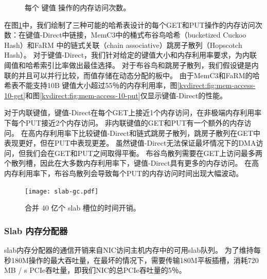 \begin{figure}[t]
\centering
{}

\vfill

\caption{每个 键值 操作的内存访问次数。}
\label{kvdirect:fig:mem-access-tput}

\end{figure}

在图\ref {kvdirect:fig:mem-access-tput}中，我们绘制了三种可能的哈希表设计的每个GET和PUT操作的内存访问次数：在键值-Direct中链接，MemC3中的桶式布谷鸟哈希（bucketized Cuckoo Hash）\cite {fan2013memc3}和FaRM \cite {dragojevic2014farm}中的链式关联（chain associative）跳房子散列（Hopscotch Hash）。
对于键值-Direct，我们针对给定的键值大小和内存利用率要求，为内联阈值和哈希索引比率做出最佳选择。
对于布谷鸟和跳房子散列，我们假设键是内联的并且可以并行比较，而值存储在动态分配的板中。
由于MemC3和FaRM的哈希表不能支持10B 键值大小超过55％的内存利用率，图\ref {kvdirect:fig:mem-access-10-get}和图\ref {kvdirect:fig:mem-access-10-put}仅显示键值-Direct的性能。

对于内联键值，键值-Direct在每个GET上接近1个内存访问，在非极端内存利用率下每个PUT接近2个内存访问。
非内联键值的GET和PUT有一个额外的内存访问。
在高内存利用率下比较键值-Direct和链式跳房子散列，跳房子散列在GET中表现更好，但在PUT中表现更差。
虽然键值-Direct无法保证最坏情况下的DMA访问，但我们会在GET和PUT之间取得平衡。
布谷鸟散列需要在GET上访问最多两个散列槽，因此在大多数内存利用率下，键值-Direct具有更多的内存访问。
在高内存利用率下，布谷鸟散列会导致每个PUT的内存访问时间出现大幅波动。


\begin{figure}[t]
\centering
\texttt{[image: slab-gc.pdf]}
\caption{合并 40 亿个 slab 槽位的时间开销。}
\label{kvdirect:fig:slab-garbage-collection}

\end{figure}

\subsubsection{Slab 内存分配器}
\label{kvdirect:sec:slab-eval}

slab内存分配器的通信开销来自NIC访问主机内存中的可用slab队列。
为了维持每秒180M操作的最大吞吐量，在最坏的情况下，需要传输180M平板插槽，消耗720 MB / s PCIe吞吐量，即我们NIC的总PCIe吞吐量的5％。

